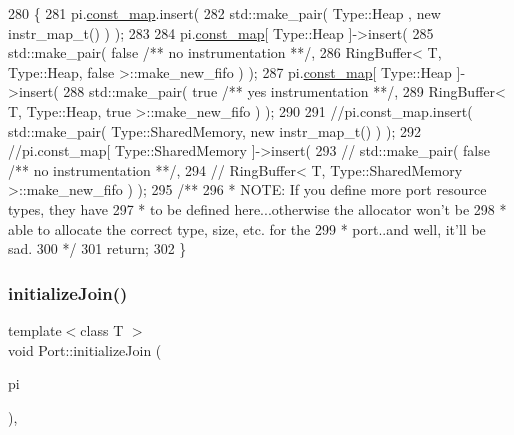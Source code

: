 \begin{DoxyCode}
280    \{
281       pi.\hyperlink{struct_port_info_a714592b5ab1fa47b599903639b102a66}{const\_map}.insert(
282          std::make\_pair( Type::Heap , \textcolor{keyword}{new} instr\_map\_t() ) );
283 
284       pi.\hyperlink{struct_port_info_a714592b5ab1fa47b599903639b102a66}{const\_map}[ Type::Heap ]->insert(
285          std::make\_pair( \textcolor{keyword}{false} \textcolor{comment}{/** no instrumentation **/},
286                          RingBuffer< T, Type::Heap, false >::make\_new\_fifo ) );
287       pi.\hyperlink{struct_port_info_a714592b5ab1fa47b599903639b102a66}{const\_map}[ Type::Heap ]->insert(
288          std::make\_pair( \textcolor{keyword}{true} \textcolor{comment}{/** yes instrumentation **/},
289                          RingBuffer< T, Type::Heap, true >::make\_new\_fifo ) );
290 
291       \textcolor{comment}{//pi.const\_map.insert( std::make\_pair( Type::SharedMemory, new instr\_map\_t() ) );}
292       \textcolor{comment}{//pi.const\_map[ Type::SharedMemory ]->insert(}
293       \textcolor{comment}{//   std::make\_pair( false /** no instrumentation **/,}
294       \textcolor{comment}{//                   RingBuffer< T, Type::SharedMemory >::make\_new\_fifo ) );}\textcolor{comment}{}
295 \textcolor{comment}{      /**}
296 \textcolor{comment}{       * NOTE: If you define more port resource types, they have}
297 \textcolor{comment}{       * to be defined here...otherwise the allocator won't be}
298 \textcolor{comment}{       * able to allocate the correct type, size, etc. for the}
299 \textcolor{comment}{       * port..and well, it'll be sad.}
300 \textcolor{comment}{       */}
301       \textcolor{keywordflow}{return};
302    \}
\end{DoxyCode}
\hypertarget{class_port_a179c9a36189eb621a5874a0741708e59}{}\label{class_port_a179c9a36189eb621a5874a0741708e59} 
\subsubsection{\texorpdfstring{initialize\+Join()}{initializeJoin()}}
{\footnotesize\ttfamily template$<$class T $>$ \\
void Port\+::initialize\+Join (\begin{DoxyParamCaption}\item[{\hyperlink{struct_port_info}{Port\+Info} \&}]{pi }\end{DoxyParamCaption})\hspace{0.3cm}{\ttfamily [inline]}, {\ttfamily [protected]}}

